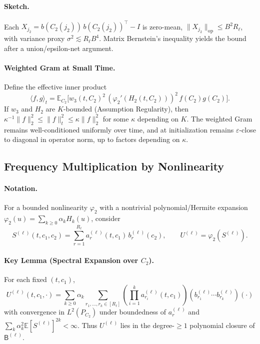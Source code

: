 \documentclass{article}
\begin{document}
\paragraph{Sketch.} Each $X_{j_2} = b(C_2(j_2))\, b(C_2(j_2))^\top - I$ is zero-mean, $ \|X_{j_2}\|_{\mathrm{op}} \leq B^2 R_\ell$, with variance proxy $\sigma^2 \lesssim R_\ell B^4$. Matrix Bernstein's inequality yields the bound after a union/epsilon-net argument.

\paragraph{Weighted Gram at Small Time.}
Define the effective inner product
\[
    \langle f,g\rangle_t = \mathbb{E}_{C_2} \big[w_3(t,C_2)^2\, (\varphi_2'(H_2(t, C_2)))^2\, f(C_2) g(C_2)\big].
\]
If $w_3$ and $H_2$ are $K$-bounded (Assumption Regularity), then $\kappa^{-1}\|f\|_2^2 \leq \|f\|_t^2 \leq \kappa\|f\|_2^2$ for some $\kappa$ depending on $K$. The weighted Gram remains well-conditioned uniformly over time, and at initialization remains $\varepsilon$-close to diagonal in operator norm, up to factors depending on $\kappa$.

\subsection{Frequency Multiplication by Nonlinearity}

\paragraph{Notation.} For a bounded nonlinearity $\varphi_2$ with a nontrivial polynomial/Hermite expansion $\varphi_2(u) = \sum_{k\geq 0}\alpha_k H_k(u)$, consider
\[
    S^{(\ell)}(t, c_1, c_2) = \sum_{r=1}^{R_\ell} a_r^{(\ell)}(t, c_1)\, b_r^{(\ell)}(c_2), \qquad U^{(\ell)} = \varphi_2(S^{(\ell)}).
\]

\paragraph{Key Lemma (Spectral Expansion over $C_2$).}
For each fixed $(t, c_1)$,
\[
    U^{(\ell)}(t, c_1, \cdot) = \sum_{k\geq 0} \alpha_k \sum_{r_1, \dots, r_k \in [R_\ell]} \left( \prod_{i=1}^k a_{r_i}^{(\ell)}(t, c_1) \right) \left( b_{r_1}^{(\ell)} \cdots b_{r_k}^{(\ell)} \right)(\cdot)
\]
with convergence in $L^2(P_{C_2})$ under boundedness of $a_r^{(\ell)}$ and $\sum_k \alpha_k^2 \mathbb{E}[ S^{(\ell)} ]^{2k } < \infty$. Thus $U^{(\ell)}$ lies in the degree-$\geq 1$ polynomial closure of $\mathsf{B}^{(\ell)}$.
\end{document}
